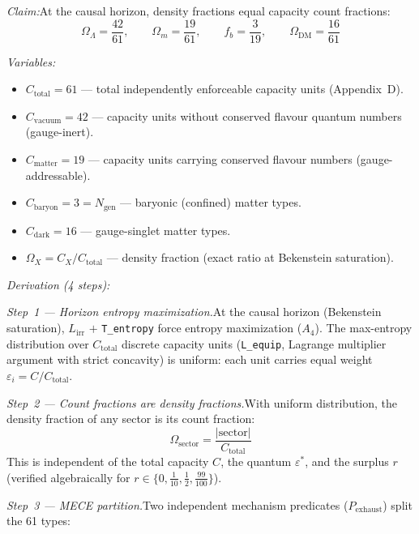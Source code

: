 \documentclass[11pt]{article}
\newcommand{\Ctot}{C_{\mathrm{total}}}
\newcommand{\OmL}{\Omega_\Lambda}
\newcommand{\Omm}{\Omega_m}
\newcommand{\OmDM}{\Omega_{\mathrm{DM}}}
\newcommand{\fb}{f_b}
\newcommand{\Ngen}{N_{\mathrm{gen}}}
\newcommand{\eps}{\varepsilon}
\newcommand{\Lirr}{L_{\mathrm{irr}}}
\begin{document}
\begin{tcolorbox}[apfbox, title={L\_equip $+$ T11/T12: Cosmological Density Fractions from Capacity Counting}]
\textit{Claim:}\quad At the causal horizon, density fractions equal capacity count fractions:
\begin{equation}
\OmL = \frac{42}{61}, \qquad \Omm = \frac{19}{61}, \qquad \fb = \frac{3}{19}, \qquad \OmDM = \frac{16}{61}
\end{equation}

\smallskip\noindent\textit{Variables:}
\begin{itemize}[nosep,leftmargin=2em]
\item $\Ctot = 61$ --- total independently enforceable capacity units (Appendix~D).
\item $C_{\mathrm{vacuum}} = 42$ --- capacity units without conserved flavour quantum numbers (gauge-inert).
\item $C_{\mathrm{matter}} = 19$ --- capacity units carrying conserved flavour numbers (gauge-addressable).
\item $C_{\mathrm{baryon}} = 3 = \Ngen$ --- baryonic (confined) matter types.
\item $C_{\mathrm{dark}} = 16$ --- gauge-singlet matter types.
\item $\Omega_X = C_X / \Ctot$ --- density fraction (exact ratio at Bekenstein saturation).
\end{itemize}
\end{tcolorbox}

\textit{Derivation (4 steps):}

\textit{Step~1 --- Horizon entropy maximization.}\quad At the causal horizon (Bekenstein saturation), $\Lirr$ $+$ \texttt{T\_entropy} force entropy maximization ($A_4$).  The max-entropy distribution over $\Ctot$ discrete capacity units (\texttt{L\_equip}, Lagrange multiplier argument with strict concavity) is uniform: each unit carries equal weight $\eps_i = C/\Ctot$.

\textit{Step~2 --- Count fractions are density fractions.}\quad With uniform distribution, the density fraction of any sector is its count fraction:
\begin{equation}
\Omega_{\mathrm{sector}} = \frac{|\mathrm{sector}|}{\Ctot}
\end{equation}
This is independent of the total capacity $C$, the quantum $\eps^*$, and the surplus $r$ (verified algebraically for $r \in \{0, \tfrac{1}{10}, \tfrac{1}{2}, \tfrac{99}{100}\}$).

\textit{Step~3 --- MECE partition.}\quad Two independent mechanism predicates ($P_{\mathrm{exhaust}}$) split the 61 types:
\end{document}
